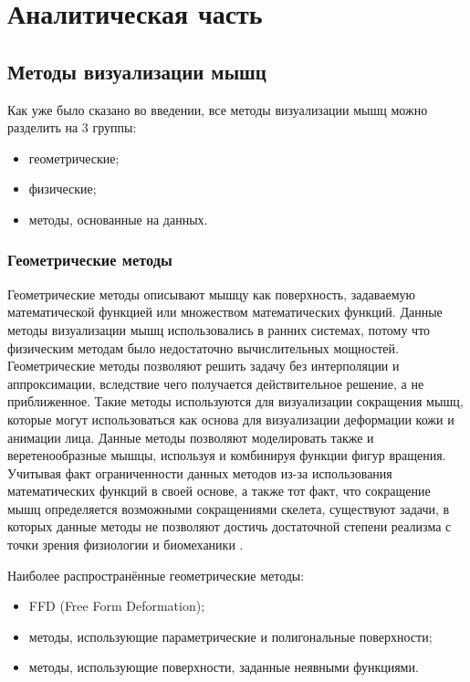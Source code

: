 \chapter{Аналитическая часть}

\section{Методы визуализации мышц}

Как уже было сказано во введении, все методы визуализации мышц можно разделить на 3 группы:
\begin{itemize}
    \item геометрические;
    \item физические;
    \item методы, основанные на данных.
\end{itemize}

\subsection{Геометрические методы}

Геометрические методы описывают мышцу как поверхность, задаваемую математической функцией или множеством математических функций. Данные методы визуализации мышц использовались в ранних системах, потому что физическим методам было недостаточно вычислительных мощностей\cite{cgv}. Геометрические методы позволяют решить задачу без интерполяции и аппроксимации, вследствие чего получается действительное решение, а не приближенное. Такие методы используются для визуализации сокращения мышц, которые могут использоваться как основа для визуализации деформации кожи и анимации лица. Данные методы позволяют моделировать также и веретенообразные мышцы, используя и комбинируя функции фигур вращения. Учитывая факт ограниченности данных методов из-за использования математических функций в своей основе, а также тот факт, что сокращение мышц определяется возможными сокращениями скелета, существуют задачи, в которых данные методы не позволяют достичь достаточной степени реализма с точки зрения физиологии и биомеханики \cite{bio}.

Наиболее распространённые геометрические методы:
\begin{itemize}
    \item FFD (Free Form Deformation)\cite{ffd};
    \item методы, использующие параметрические и полигональные поверхности\cite{pps};
    \item методы, использующие поверхности, заданные неявными функциями\cite{is1}\cite{is2}.
\end{itemize}

